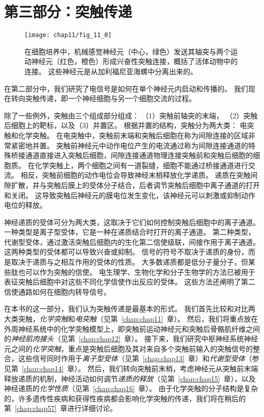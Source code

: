 \chapter*{第三部分：突触传递}


\begin{figure}[htbp]
	\centering
	\texttt{[image: chap11/fig\_11\_0]}
	\caption{在细胞培养中，机械感觉神经元（中心，绿色）发送其轴突与两个运动神经元（红色，橙色）形成兴奋性突触连接，概括了活体动物中的连接。
		这些神经元是从加利福尼亚海螺中分离出来的。}
	\label{fig:11_0}
\end{figure}


在第二部分中，我们研究了电信号是如何在单个神经元内启动和传播的。
我们现在转向突触传递，即一个神经细胞与另一个细胞交流的过程。


除了一些例外，突触由三个组成部分组成：
（1）突触前轴突的末端，
（2）突触后细胞上的靶标，以及（3）并置区。
根据并置的结构，突触分为两大类：
电突触和化学突触。
在电突触中，突触前末端和突触后细胞在称为间隙连接的区域非常紧密地并置。
突触前神经元中动作电位产生的电流通过称为间隙连接通道的特殊桥接通道直接进入突触后细胞，间隙连接通道物理连接突触前和突触后细胞的细胞质。
在化学突触上，两个细胞之间有一道裂缝，细胞不能通过桥接通道进行交流。
相反，突触前细胞的动作电位会导致神经末梢释放化学递质。
递质在突触间隙扩散，并与突触后膜上的受体分子结合，后者调节突触后细胞中离子通道的打开和关闭。
这导致突触后神经元的膜电位发生变化，该神经元可以刺激或抑制动作电位的释放。


神经递质的受体可分为两大类，这取决于它们如何控制突触后细胞中的离子通道。
一种类型是离子型受体，它是一种在递质结合时打开的离子通道。
第二种类型，代谢型受体，通过激活突触后细胞内的生化第二信使级联，间接作用于离子通道。
这两种类型的受体都可以导致兴奋或抑制。
信号的符号不取决于递质的身份，而是取决于递质与之相互作用的受体的性质。
大多数递质都是低分子量分子，但某些肽也可以作为突触的信使。
电生理学、生物化学和分子生物学的方法已被用于表征突触后细胞中对这些不同化学信使作出反应的受体。
这些方法还阐明了第二信使通路如何在细胞内转导信号。


在本书的这一部分，我们认为突触传递是最基本的形式。
我们首先比较和对比两大类突触，\textit{化学突触}和\textit{电突触}（见第~\ref{chap:chap11}~章）。
然后，我们将重点放在外周神经系统中的化学突触模型上，即突触前运动神经元和突触后骨骼肌纤维之间的\textit{神经肌肉接头}（见第~\ref{chap:chap12}~章）。
接下来，我们研究中枢神经系统神经元之间的\textit{化学突触}，重点是突触后细胞及其对来自多个突触前输入的突触信号的整合，这些信号同时作用于\textit{离子型受体}（见第~\ref{chap:chap13}~章）和\textit{代谢型受体}（参见第~\ref{chap:chap14}~章）。
然后，我们转向突触前末梢，考虑神经元从突触前末端释放递质的机制，神经活动如何调节\textit{递质的释放}（见第~\ref{chap:chap15}~章），以及神经递质的\textit{化学性质}（见第~\ref{chap:chap16}~章）。
由于化学突触的分子结构是复杂的，许多遗传性疾病和获得性疾病都会影响化学突触的传递，我们将在稍后的第~\ref{chap:chap57}~章进行详细讨论。


